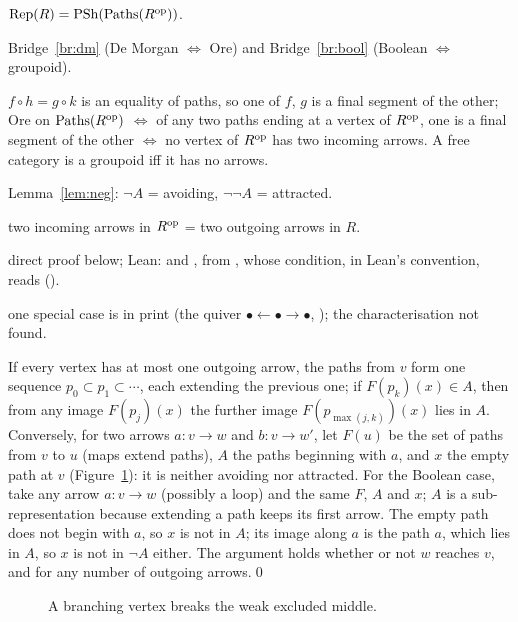 \begin{trace}
\item[deck] $\mathrm{Rep}(R) = \mathrm{PSh}(\mathrm{Paths}(R^{\mathrm{op}}))$.
\item[arch] Bridge~\ref{br:dm} (De Morgan $\iff$ Ore) and Bridge~\ref{br:bool} (Boolean $\iff$ groupoid).
\item[specialise] $f\circ h = g\circ k$ is an equality of paths, so one of $f$, $g$ is a final segment of the other; Ore on $\mathrm{Paths}(R^{\mathrm{op}})$ $\iff$ of any two paths ending at a vertex of $R^{\mathrm{op}}$, one is a final segment of the other $\iff$ no vertex of $R^{\mathrm{op}}$ has two incoming arrows. A free category is a groupoid iff it has no arrows.
\item[unfold] Lemma~\ref{lem:neg}: $\neg A$ = avoiding, $\neg\neg A$ = attracted.
\item[rewrite] two incoming arrows in $R^{\mathrm{op}}$ = two outgoing arrows in $R$.
\item[verify] direct proof below; Lean:  and , from , whose condition, in Lean's convention, reads  ().
\item[novelty] one special case is in print (the quiver $\bullet\leftarrow\bullet\to\bullet$, \cite[\S4.1.4]{caramello-chamoun}); the characterisation not found.
\end{trace}

\direct{} If every vertex has at most one outgoing arrow, the paths from $v$ form one sequence $p_0\subset p_1\subset\cdots$, each extending the previous one; if $F(p_k)(x)\in A$, then from any image $F(p_j)(x)$ the further image $F(p_{\max(j,k)})(x)$ lies in $A$. Conversely, for two arrows $a : v\to w$ and $b : v\to w'$, let $F(u)$ be the set of paths from $v$ to $u$ (maps extend paths), $A$ the paths beginning with $a$, and $x$ the empty path at $v$ (Figure~\ref{fig:branch}): it is neither avoiding nor attracted. For the Boolean case, take any arrow $a : v\to w$ (possibly a loop) and the same $F$, $A$ and $x$; $A$ is a sub-representation because extending a path keeps its first arrow. The empty path does not begin with $a$, so $x$ is not in $A$; its image along $a$ is the path $a$, which lies in $A$, so $x$ is not in $\neg A$ either. The argument holds whether or not $w$ reaches $v$, and for any number of outgoing arrows.\qed

\begin{figure}[ht]
\centering
{}
\caption{A branching vertex breaks the weak excluded middle.}\label{fig:branch}
\end{figure}

